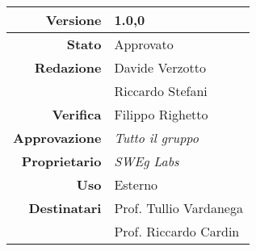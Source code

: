 \begin{center}
\begin{tabular}{r|l}
    \textbf{Versione} & 1.0,0 \\
    \hline
    \textbf{Stato} & Approvato \\
    \hline
    \textbf{Redazione} & Davide Verzotto \\
                       & Riccardo Stefani \\
    \hline
    \textbf{Verifica} & Filippo Righetto \\
    \hline
    \textbf{Approvazione} & \emph{Tutto il gruppo} \\
    \hline
    \textbf{Proprietario} & \emph{SWEg Labs} \\
    \hline
    \textbf{Uso} & Esterno \\
    \hline
    \textbf{Destinatari} & Prof. Tullio Vardanega \\
                         & Prof. Riccardo Cardin \\
\end{tabular}
\end{center}
